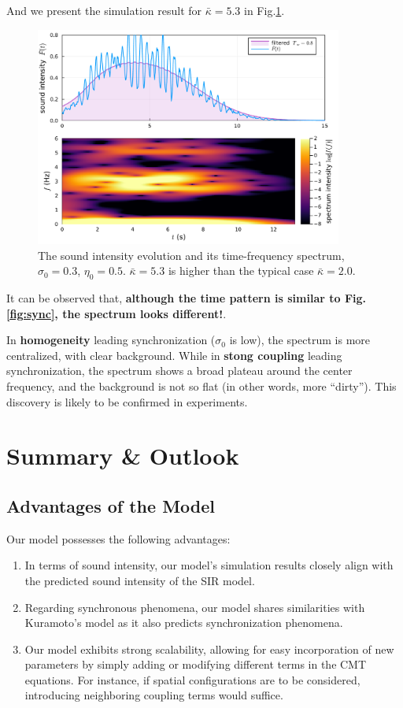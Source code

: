 \documentclass[UTF8,a4paper,11pt]{ctexart}
\begin{document}
And we present the simulation result for $\bar{κ}=5.3$ in Fig.\ref{fig:synckappa}.

\begin{figure}[H]
    \centering
    \includegraphics[width=0.9\textwidth]{k53.pdf}
    \caption{The sound intensity evolution and its time-frequency spectrum, $σ_0 = 0.3$, $η_0=0.5$. $\bar{κ} = 5.3$ is higher than the typical case $\bar{κ} = 2.0$.}
    \label{fig:synckappa}
\end{figure}

It can be observed that, \textbf{although the time pattern is similar to Fig.\ref{fig:sync}, the spectrum looks different!}. 

In \textbf{homogeneity} leading synchronization ($σ_0$ is low), the spectrum is more centralized, with clear background. While in \textbf{stong coupling} leading synchronization, the spectrum shows a broad plateau around the center frequency, and the background is not so flat (in other words, more ``dirty''). This discovery is likely to be confirmed in experiments.

\section{Summary \& Outlook}

\subsection{Advantages of the Model}

Our model possesses the following advantages:
\begin{enumerate}
    \item In terms of sound intensity, our model's simulation results closely align with the predicted sound intensity of the SIR model.

    \item Regarding synchronous phenomena, our model shares similarities with Kuramoto's model as it also predicts synchronization phenomena.

    \item Our model exhibits strong scalability, allowing for easy incorporation of new parameters by simply adding or modifying different terms in the CMT equations. For instance, if spatial configurations are to be considered, introducing neighboring coupling terms would suffice.
\end{enumerate}
\end{document}
